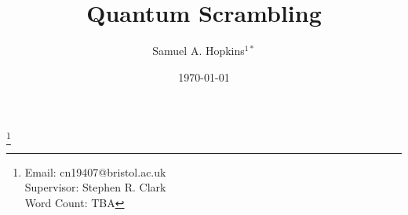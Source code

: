 \documentclass[ aps]{revtex4-2}
\begin{document}
\title{Quantum Scrambling}

\author{Samuel A. Hopkins$^{1*}$}
\date{\today}
\thanks{Email: cn19407@bristol.ac.uk\\
Supervisor: Stephen R. Clark\\
Word Count: TBA
}

\maketitle

\clearpage
\tableofcontents



% 
%


\end{document}
